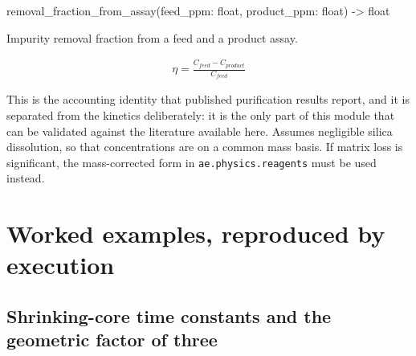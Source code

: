 \documentclass[10pt,a4paper,twoside]{report}
\begin{document}
\begin{verbatimsmall}
removal_fraction_from_assay(feed_ppm: float, product_ppm: float) -> float
\end{verbatimsmall}

Impurity removal fraction from a feed and a product assay.

\begin{equation*}
\begin{gathered}
\eta = \frac{C_{feed} - C_{product}}{C_{feed}}
\end{gathered}
\end{equation*}

This is the accounting identity that published purification results report, and it is separated from the kinetics deliberately: it is the only part of this module that can be validated against the literature available here. Assumes negligible silica dissolution, so that concentrations are on a common mass basis. If matrix loss is significant, the mass-corrected form in \texttt{ae.physics.reagents} must be used instead.

\section{Worked examples, reproduced by execution}

\subsection*{Shrinking-core time constants and the geometric factor of three}
\end{document}
